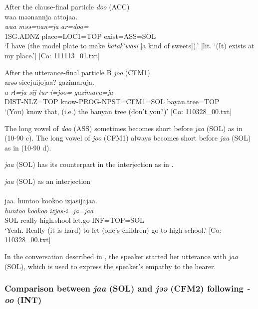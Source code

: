   \ex After the clause-final particle \textit{doo} (ACC)\\
      \glll    waa  məənannja  attojaa.\\
    \textit{waa}  \textit{məə=nan=ja}  \textit{ar=doo=}\\
    1SG.ADNZ  place=LOC1=TOP  exist=ASS=SOL\\
    \glt     ‘I have (the model plate to make \textit{katakˀwasi} [a kind of sweets]).’ [lit. ‘(It) exists at my place.’]  [Co: 111113\_01.txt]

   \ex After the utterance-final particle B \textit{joo} (CFM1)\\
      \glll    arəə  siccjuijojaa?  gazimaruja.\\
    \textit{a-rɨ=ja}  \textit{sij-tur-i=joo=}  \textit{gazimaru=ja}\\
    DIST-NLZ=TOP  know-PROG-NPST=CFM1=SOL  bayan.tree=TOP\\
 \glt     ‘(You) know that, (i.e.) the banyan tree (don’t you?)’  [Co: 110328\_00.txt]
 \z
\z

The long vowel of \textit{doo} (ASS) sometimes becomes short before \textit{jaa} (SOL) as in (10-90 c). The long vowel of \textit{joo} (CFM1) always becomes short before \textit{jaa} (SOL) as in (10-90 d).

  \textit{jaa} (SOL) has its counterpart in the interjection as in .

\ea\label{ex:10.91}   \textit{jaa} (SOL) as an interjection\\\\
      \glll    jaa.  huntoo  {\textbar}kookoo{\textbar}  izjasijajaa.\\
    \textit{}  \textit{huntoo}  \textit{kookoo}  \textit{izjas-i=ja=jaa}\\
    SOL  really  high.shool  let.go-INF=TOP=SOL\\
\glt     ‘Yeah. Really (it is hard) to let (one’s children) go to high school.’  [Co: 110328\_00.txt]
\z

In the conversation described in , the speaker started her utterance with \textit{jaa} (SOL), which is used to express the speaker’s empathy to the hearer.

\subsubsection{Comparison between \textit{jaa} (SOL) and \textit{jəə} (CFM2) following \textit{{}-oo} (INT)}\label{sec:10.5.2.2}

